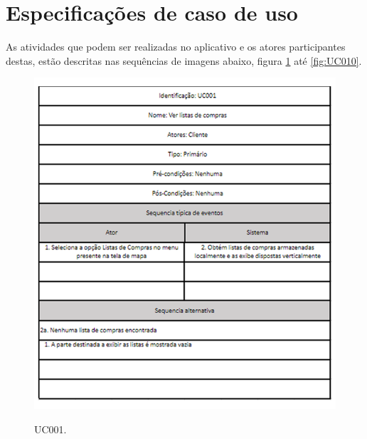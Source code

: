 \section{Especificações de caso de uso}
As  atividades que podem ser realizadas no aplicativo e os atores participantes destas, estão descritas nas sequências de imagens abaixo, figura  \ref{fig:UC001} até \ref{fig:UC010}.
\begin{figure}[H]
    \centering
        \caption{UC001.}
        \includegraphics[scale=0.8]{Imagens/UC001.PNG}
        \label{fig:UC001}
\end{figure}
	
